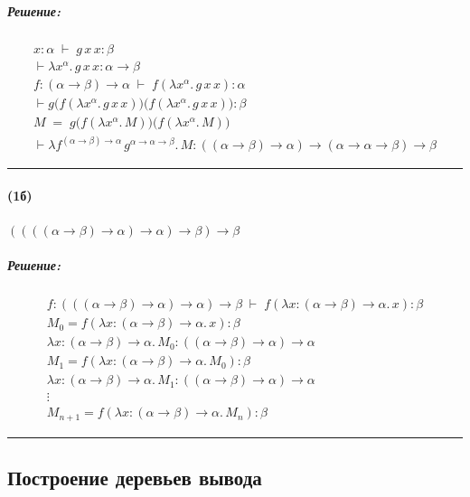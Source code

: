\documentclass{article}
\newenvironment{proof}{\subparagraph{\hspace{-1em}Решение:\newline}}{\par\noindent\rule{\textwidth}{0.4pt}}
\begin{document}
    \begin{proof}
        \begin{gather*}
            x:\alpha \;\vdash\; g\,x\,x : \beta \\
            \vdash \lambda x^\alpha.\, g\,x\,x : \alpha \to \beta \\
            f:(\alpha\to\beta)\to\alpha \;\vdash\; f(\lambda x^\alpha.\, g\,x\,x) : \alpha \\
            \vdash g\bigl(f(\lambda x^\alpha.\, g\,x\,x)\bigr)\bigl(f(\lambda x^\alpha.\, g\,x\,x)\bigr) : \beta \\
            M \;=\; g\bigl(f(\lambda x^\alpha.\, M)\bigr)\bigl(f(\lambda x^\alpha.\, M)\bigr) \\
            \vdash \lambda f^{(\alpha\to\beta)\to\alpha}\, g^{\alpha\to\alpha\to\beta}.\, M
            : ((\alpha\to\beta)\to\alpha)\to(\alpha\to\alpha\to\beta)\to\beta
        \end{gather*}
    \end{proof}

    \paragraph{(1б)} $((((\alpha \to \beta) \to \alpha) \to \alpha) \to \beta) \to \beta$

    \begin{proof}
        \begin{gather*}
            f : (((\alpha \to \beta) \to \alpha) \to \alpha) \to \beta \;\vdash\; f(\lambda x:(\alpha\to\beta)\to\alpha.\, x) : \beta \\
            M_0 = f(\lambda x:(\alpha\to\beta)\to\alpha.\, x) : \beta \\
            \lambda x:(\alpha\to\beta)\to\alpha.\, M_0 : ((\alpha\to\beta)\to\alpha) \to \alpha \\
            M_1 = f(\lambda x:(\alpha\to\beta)\to\alpha.\, M_0) : \beta \\
            \lambda x:(\alpha\to\beta)\to\alpha.\, M_1 : ((\alpha\to\beta)\to\alpha) \to \alpha \\
            \vdots \\
            M_{n+1} = f(\lambda x:(\alpha\to\beta)\to\alpha.\, M_n) : \beta
        \end{gather*}
    \end{proof}

    \subsection{Построение деревьев вывода}
\end{document}
